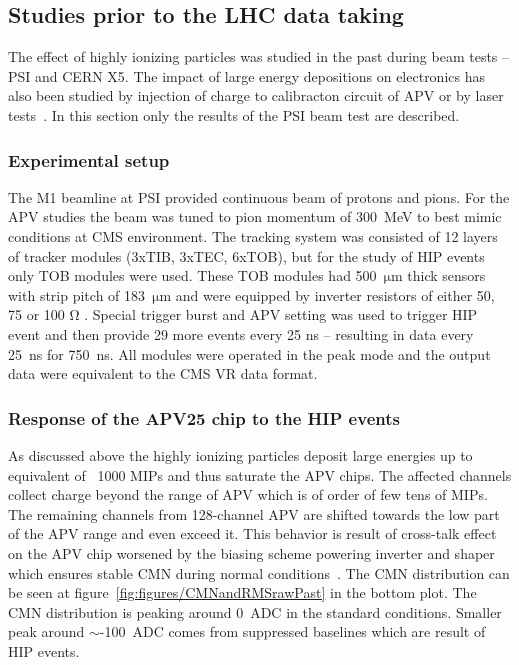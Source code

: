\subsection{Studies prior to the LHC data taking~\label{sec:HIPinPast}}

The effect of highly ionizing particles was studied in the past during beam tests -- PSI and CERN X5. The impact of large energy depositions on electronics has also been studied by injection of charge to calibracton circuit of APV or by laser tests~\cite{Adam:2005pz}. In this section only the results of the PSI beam test are described.

\subsubsection{Experimental setup}

The M1 beamline at PSI provided continuous beam of protons and pions. For the APV studies the beam was tuned to pion momentum of 300~MeV to best mimic conditions at CMS environment. The tracking system was consisted of 12 layers of tracker modules (3xTIB, 3xTEC, 6xTOB), but for the study of HIP events only TOB modules were used. These TOB modules had 500~$\mathrm{\mu m}$ thick sensors with strip pitch of 183~$\mathrm{\mu}$m and were equipped by inverter resistors of either 50, 75 or 100 $\mathrm{\Omega}$ . Special trigger burst and APV setting was used to trigger HIP event and then provide 29 more events every 25 ns -- resulting in data every 25~ns for 750~ns. All modules were operated in the peak mode and the output data were equivalent to the CMS VR data format. 




\subsubsection{Response of the APV25 chip to the HIP events}

As discussed above the highly ionizing particles deposit large energies up to equivalent of ~1000 MIPs and thus saturate the APV chips. The affected channels collect charge beyond the range of APV which is of order of few tens of MIPs. The remaining channels from 128-channel APV are shifted towards the low part of the APV range and even exceed it. This behavior is result of cross-talk effect on the APV chip worsened by the biasing scheme powering inverter and shaper which ensures stable CMN during normal conditions~\cite{Bainbridge:2004jc}. The CMN distribution can be seen at figure~\ref{fig:figures/CMNandRMSrawPast} in the bottom plot. The CMN distribution is peaking around 0~ADC in the standard conditions. Smaller peak around $\sim$-100~ADC comes from suppressed baselines which are result of HIP events. 


